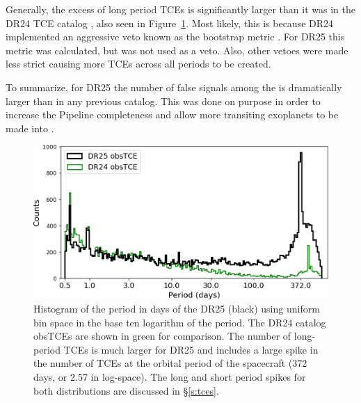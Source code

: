 Generally, the excess of long period TCEs is significantly larger than it was in the DR24 TCE catalog \citep{Seader2015}, also seen in Figure~\ref{f:obstces}. Most likely, this is because DR24 implemented an aggressive veto known as the bootstrap metric \citep{Seader2015}.  For DR25 this metric was calculated, but was not used as a veto. Also, other vetoes were made less strict causing more TCEs across all periods to be created. 

To summarize, for DR25 the number of false signals among the  is dramatically larger than in any previous catalog. This was done on purpose in order to increase the Pipeline completeness and allow more transiting exoplanets to be made into . 

\begin{figure}[htb]
 \begin{center}
  \includegraphics[width=\linewidth]{fig-obstcePeriods-trimmed.png}
  \caption{Histogram of the period in days of the DR25  (black) using uniform bin space in the base ten logarithm of the period. The DR24 catalog obsTCEs \citep{Seader2015} are shown in green for comparison. The number of long-period TCEs is much larger for DR25 and includes a large spike in the number of TCEs at the orbital period of the spacecraft (372 days, or 2.57 in log-space). The long and short period spikes for both distributions are discussed in \S\ref{s:tces}.}
  \label{f:obstces} 
 \end{center}
 \end{figure}



